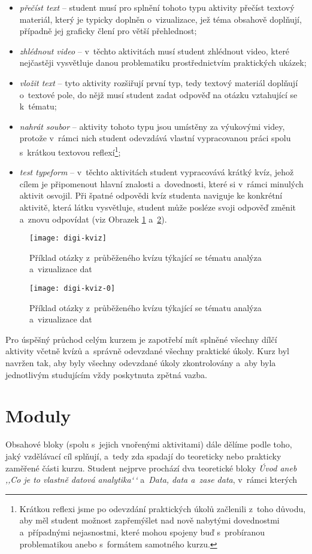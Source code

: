 \begin{itemize}
\tightlist
\item
  \emph{přečíst text} -- student musí pro splnění tohoto typu aktivity přečíst textový materiál, který je typicky doplněn o~vizualizace, jež téma obsahově doplňují, případně jej graficky člení pro větší přehlednost;
\item
  \emph{zhlédnout video} -- v~těchto aktivitách musí student zhlédnout video, které nejčastěji vysvětluje danou problematiku prostřednictvím praktických ukázek;
\item
  \emph{vložit text} -- tyto aktivity rozšiřují první typ, tedy textový materiál doplňují o~textové pole, do nějž musí student zadat odpověď na otázku vztahující se k~tématu;
\item
  \emph{nahrát soubor} -- aktivity tohoto typu jsou umístěny za výukovými videy, protože v~rámci nich student odevzdává vlastní vypracovanou práci spolu s~krátkou textovou reflexí\footnote{Krátkou reflexi jsme po odevzdání praktických úkolů začlenili z~toho důvodu, aby měl student možnost zapřemýšlet nad nově nabytými dovednostmi a~případnými nejasnostmi, které mohou spojeny buď s~probíranou problematikou anebo s~formátem samotného kurzu.};
\item
  \emph{test typeform} -- v~těchto aktivitách student vypracovává krátký kvíz, jehož cílem je připomenout hlavní znalosti a~dovednosti, které si v~rámci minulých aktivit osvojil. Při špatné odpovědi kvíz studenta naviguje ke konkrétní aktivitě, která látku vysvětluje, student může posléze svoji odpověď změnit a~znovu odpovídat (viz Obrazek \ref{digi-kviz} a~\ref{digi-kviz-0}).
\end{itemize}

\begin{figure}[ht]   
    \centering
    \texttt{[image: digi-kviz]}  
    \caption{Příklad otázky z~průběženého kvízu týkající se tématu analýza a~vizualizace dat}
    \label{digi-kviz}
\end{figure}

\begin{figure}[ht]   
    \centering
    \texttt{[image: digi-kviz-0]}  
    \caption{Příklad otázky z~průběženého kvízu týkající se tématu analýza a~vizualizace dat}
    \label{digi-kviz-0}
\end{figure}

Pro úspěšný průchod celým kurzem je zapotřebí mít splněné všechny dílčí aktivity včetně kvízů a~správně odevzdané všechny praktické úkoly. Kurz byl navržen tak, aby byly všechny odevzdané úkoly zkontrolovány a~aby byla jednotlivým studujícím vždy poskytnuta zpětná vazba.

\hypertarget{moduly}{%
\section{Moduly}\label{moduly}}

Obsahové bloky (spolu s~jejich vnořenými aktivitami) dále dělíme podle toho, jaký vzdělávací cíl splňují, a~tedy zda spadají do teoreticky nebo prakticky zaměřené části kurzu. Student nejprve prochází dva teoretické bloky \emph{Úvod aneb ‚‚Co je to vlastně datová analytika`\,`} a~\emph{Data, data a~zase data}, v~rámci kterých

